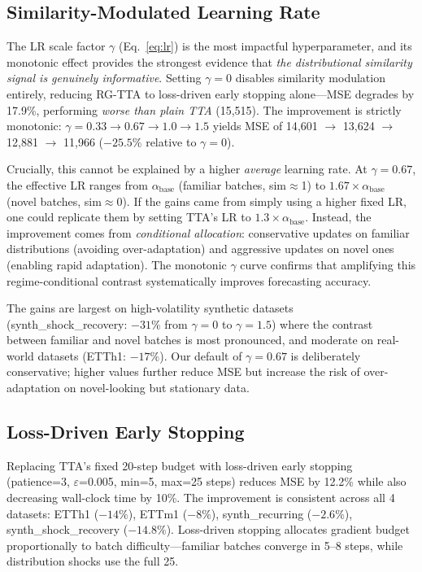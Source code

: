 \documentclass[journal]{IEEEtran}
\begin{document}
\subsection{Similarity-Modulated Learning Rate}
\label{sec:ablation_lr}

The LR scale factor $\gamma$ (Eq.~\ref{eq:lr}) is the most impactful hyperparameter, and its monotonic effect provides the strongest evidence that \emph{the distributional similarity signal is genuinely informative}. Setting $\gamma = 0$ disables similarity modulation entirely, reducing RG-TTA to loss-driven early stopping alone---MSE degrades by 17.9\%, performing \emph{worse than plain TTA} (15{,}515). The improvement is strictly monotonic: $\gamma = 0.33 \rightarrow 0.67 \rightarrow 1.0 \rightarrow 1.5$ yields MSE of 14{,}601 $\rightarrow$ 13{,}624 $\rightarrow$ 12{,}881 $\rightarrow$ 11{,}966 ($-25.5\%$ relative to $\gamma{=}0$).

Crucially, this cannot be explained by a higher \emph{average} learning rate. At $\gamma = 0.67$, the effective LR ranges from $\alpha_{\text{base}}$ (familiar batches, sim$\approx$1) to $1.67 \times \alpha_{\text{base}}$ (novel batches, sim$\approx$0). If the gains came from simply using a higher fixed LR, one could replicate them by setting TTA's LR to $1.3 \times \alpha_{\text{base}}$. Instead, the improvement comes from \emph{conditional allocation}: conservative updates on familiar distributions (avoiding over-adaptation) and aggressive updates on novel ones (enabling rapid adaptation). The monotonic $\gamma$ curve confirms that amplifying this regime-conditional contrast systematically improves forecasting accuracy.

The gains are largest on high-volatility synthetic datasets (synth\_shock\_recovery: $-31\%$ from $\gamma{=}0$ to $\gamma{=}1.5$) where the contrast between familiar and novel batches is most pronounced, and moderate on real-world datasets (ETTh1: $-17\%$). Our default of $\gamma = 0.67$ is deliberately conservative; higher values further reduce MSE but increase the risk of over-adaptation on novel-looking but stationary data.

\subsection{Loss-Driven Early Stopping}

Replacing TTA's fixed 20-step budget with loss-driven early stopping (patience=3, $\varepsilon$=0.005, min=5, max=25 steps) reduces MSE by 12.2\% while also decreasing wall-clock time by 10\%. The improvement is consistent across all 4 datasets: ETTh1 ($-14\%$), ETTm1 ($-8\%$), synth\_recurring ($-2.6\%$), synth\_shock\_recovery ($-14.8\%$). Loss-driven stopping allocates gradient budget proportionally to batch difficulty---familiar batches converge in 5--8 steps, while distribution shocks use the full 25.
\end{document}
